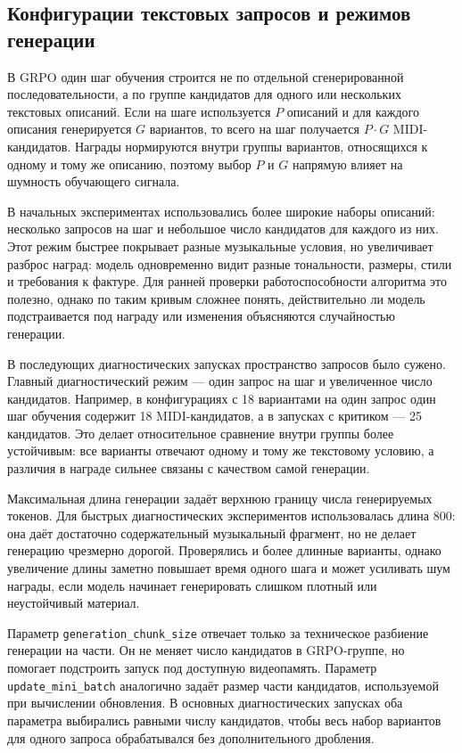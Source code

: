 \documentclass[a4paper,12pt]{extarticle}
\begin{document}
\subsection{Конфигурации текстовых запросов и режимов генерации}

В GRPO один шаг обучения строится не по отдельной сгенерированной
последовательности, а по группе кандидатов для одного или нескольких
текстовых описаний. Если на шаге используется $P$ описаний и для каждого
описания генерируется $G$ вариантов, то всего на шаг получается
$P \cdot G$ MIDI-кандидатов. Награды нормируются внутри группы вариантов,
относящихся к одному и тому же описанию, поэтому выбор $P$ и $G$ напрямую
влияет на шумность обучающего сигнала.

В начальных экспериментах использовались более широкие наборы описаний:
несколько запросов на шаг и небольшое число кандидатов для каждого
из них. Этот режим быстрее покрывает разные музыкальные условия, но
увеличивает разброс наград: модель одновременно видит разные тональности,
размеры, стили и требования к фактуре. Для ранней проверки работоспособности
алгоритма это полезно, однако по таким кривым сложнее понять, действительно
ли модель подстраивается под награду или изменения объясняются случайностью
генерации.

В последующих диагностических запусках пространство запросов было
сужено. Главный диагностический режим --- один запрос на шаг и увеличенное число
кандидатов. Например, в конфигурациях с 18 вариантами на один запрос один
шаг обучения содержит 18 MIDI-кандидатов, а в запусках с критиком ---
25 кандидатов. Это делает относительное сравнение
внутри группы более устойчивым: все варианты отвечают одному и тому же
текстовому условию, а различия в награде сильнее связаны с качеством самой
генерации.

Максимальная длина генерации задаёт верхнюю границу числа генерируемых
токенов. Для быстрых диагностических экспериментов использовалась длина 800:
она даёт достаточно содержательный музыкальный фрагмент, но
не делает генерацию чрезмерно дорогой. Проверялись и более длинные
варианты, однако увеличение длины заметно повышает время одного шага и может
усиливать шум награды, если модель начинает генерировать слишком плотный или
неустойчивый материал.

Параметр \texttt{generation\_chunk\_size} отвечает только за техническое
разбиение генерации на части. Он не меняет число кандидатов в GRPO-группе, но
помогает подстроить запуск под доступную видеопамять. Параметр
\texttt{update\_mini\_batch} аналогично задаёт размер части кандидатов,
используемой при вычислении обновления. В основных диагностических запусках
оба параметра выбирались равными числу кандидатов, чтобы весь набор
вариантов для одного запроса обрабатывался без дополнительного дробления.
\end{document}
